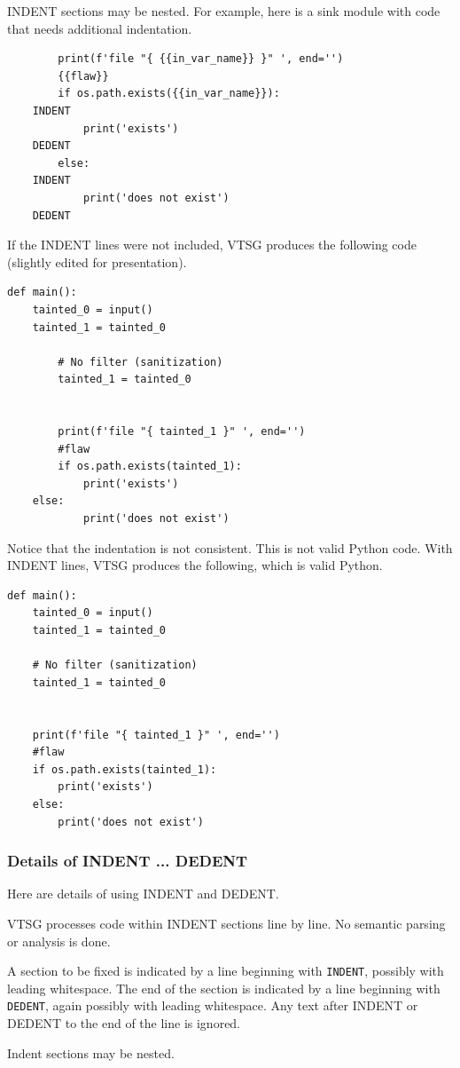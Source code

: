 \documentclass[12pt]{article}
\begin{document}
INDENT sections may be nested.  For example, here is a sink module with code that
needs additional indentation.
\begin{verbatim}
        print(f'file "{ {{in_var_name}} }" ', end='')
        {{flaw}}
        if os.path.exists({{in_var_name}}):
	INDENT
            print('exists')
	DEDENT
        else:
	INDENT
            print('does not exist')
	DEDENT
\end{verbatim}
If the INDENT lines were not included, VTSG produces the following code (slightly
edited for presentation).
\begin{verbatim}
def main():
    tainted_0 = input()
    tainted_1 = tainted_0
    
        # No filter (sanitization)
        tainted_1 = tainted_0
            
    
        print(f'file "{ tainted_1 }" ', end='')
        #flaw
        if os.path.exists(tainted_1):
            print('exists')
	else:
            print('does not exist')
\end{verbatim}
Notice that the indentation is not consistent. This is not valid Python code.
With INDENT lines, VTSG produces the following, which is valid Python.
\begin{verbatim}
def main():
    tainted_0 = input()
    tainted_1 = tainted_0

    # No filter (sanitization)
    tainted_1 = tainted_0


    print(f'file "{ tainted_1 }" ', end='')
    #flaw
    if os.path.exists(tainted_1):
        print('exists')
    else:
        print('does not exist')
\end{verbatim}


\subsubsection{Details of INDENT ... DEDENT}

Here are details of using INDENT and DEDENT.

VTSG processes code within INDENT sections line by line. No semantic parsing or
analysis is done.

A section to be fixed is indicated by a line beginning with \verb|INDENT|, possibly
with leading whitespace. The end of the section is indicated by a line beginning with
\verb|DEDENT|, again possibly with leading whitespace. Any text after INDENT or
DEDENT to the end of the line is ignored.

Indent sections may be nested.
\end{document}
